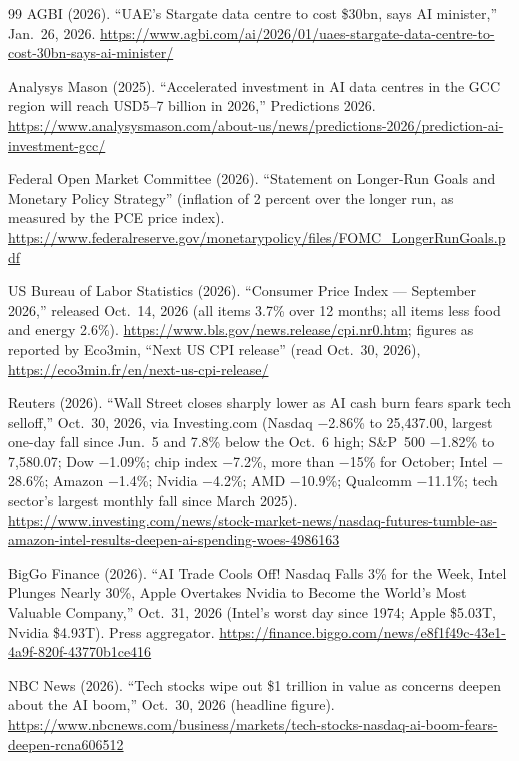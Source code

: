 \documentclass[11pt,letterpaper]{article}
\begin{document}
\begin{thebibliography}{99}
AGBI (2026). ``UAE's Stargate data centre to cost \$30bn, says AI minister,'' Jan.~26, 2026. \url{https://www.agbi.com/ai/2026/01/uaes-stargate-data-centre-to-cost-30bn-says-ai-minister/}

Analysys Mason (2025). ``Accelerated investment in AI data centres in the GCC region will reach USD5--7 billion in 2026,'' Predictions 2026. \url{https://www.analysysmason.com/about-us/news/predictions-2026/prediction-ai-investment-gcc/}

Federal Open Market Committee (2026). ``Statement on Longer-Run Goals and Monetary Policy Strategy'' (inflation of 2 percent over the longer run, as measured by the PCE price index). \url{https://www.federalreserve.gov/monetarypolicy/files/FOMC_LongerRunGoals.pdf}

US Bureau of Labor Statistics (2026). ``Consumer Price Index --- September 2026,'' released Oct.~14, 2026 (all items 3.7\% over 12 months; all items less food and energy 2.6\%). \url{https://www.bls.gov/news.release/cpi.nr0.htm}; figures as reported by Eco3min, ``Next US CPI release'' (read Oct.~30, 2026), \url{https://eco3min.fr/en/next-us-cpi-release/}

Reuters (2026). ``Wall Street closes sharply lower as AI cash burn fears spark tech selloff,'' Oct.~30, 2026, via Investing.com (Nasdaq $-$2.86\% to 25,437.00, largest one-day fall since Jun.~5 and 7.8\% below the Oct.~6 high; S\&P~500 $-$1.82\% to 7,580.07; Dow $-$1.09\%; chip index $-$7.2\%, more than $-$15\% for October; Intel $-$28.6\%; Amazon $-$1.4\%; Nvidia $-$4.2\%; AMD $-$10.9\%; Qualcomm $-$11.1\%; tech sector's largest monthly fall since March 2025). \url{https://www.investing.com/news/stock-market-news/nasdaq-futures-tumble-as-amazon-intel-results-deepen-ai-spending-woes-4986163}

BigGo Finance (2026). ``AI Trade Cools Off! Nasdaq Falls 3\% for the Week, Intel Plunges Nearly 30\%, Apple Overtakes Nvidia to Become the World's Most Valuable Company,'' Oct.~31, 2026 (Intel's worst day since 1974; Apple \$5.03T, Nvidia \$4.93T). Press aggregator. \url{https://finance.biggo.com/news/e8f1f49c-43e1-4a9f-820f-43770b1ce416}

NBC News (2026). ``Tech stocks wipe out \$1 trillion in value as concerns deepen about the AI boom,'' Oct.~30, 2026 (headline figure). \url{https://www.nbcnews.com/business/markets/tech-stocks-nasdaq-ai-boom-fears-deepen-rcna606512}


\end{thebibliography}
\end{document}
